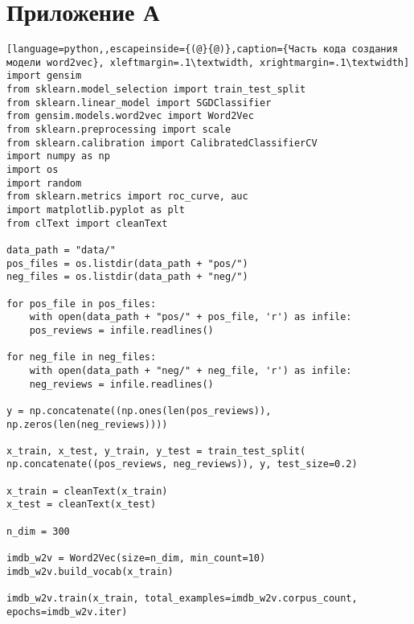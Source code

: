 \chapter{Приложение А}
\label{cha:appendix1}


\captionsetup{justification=centering}

\begin{lstlisting}[language=python,,escapeinside={(@}{@)},caption={Часть кода создания модели word2vec}, xleftmargin=.1\textwidth, xrightmargin=.1\textwidth] 
import gensim
from sklearn.model_selection import train_test_split
from sklearn.linear_model import SGDClassifier
from gensim.models.word2vec import Word2Vec
from sklearn.preprocessing import scale
from sklearn.calibration import CalibratedClassifierCV
import numpy as np
import os
import random
from sklearn.metrics import roc_curve, auc
import matplotlib.pyplot as plt
from clText import cleanText

data_path = "data/"
pos_files = os.listdir(data_path + "pos/")
neg_files = os.listdir(data_path + "neg/")

for pos_file in pos_files:  
	with open(data_path + "pos/" + pos_file, 'r') as infile:
	pos_reviews = infile.readlines()

for neg_file in neg_files:
	with open(data_path + "neg/" + neg_file, 'r') as infile:
	neg_reviews = infile.readlines()

y = np.concatenate((np.ones(len(pos_reviews)), np.zeros(len(neg_reviews))))

x_train, x_test, y_train, y_test = train_test_split(
np.concatenate((pos_reviews, neg_reviews)), y, test_size=0.2)

x_train = cleanText(x_train)
x_test = cleanText(x_test)

n_dim = 300

imdb_w2v = Word2Vec(size=n_dim, min_count=10)
imdb_w2v.build_vocab(x_train)

imdb_w2v.train(x_train, total_examples=imdb_w2v.corpus_count,
epochs=imdb_w2v.iter)



\end{lstlisting}
